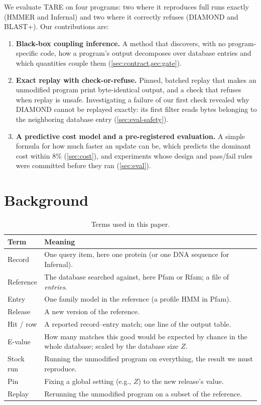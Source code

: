 \documentclass[letterpaper,twocolumn,10pt]{article}
\theoremstyle{definition}
\newcommand{\sys}{TARE\xspace}
\begin{document}
We evaluate \sys on four programs: two where it reproduces full runs exactly (HMMER and Infernal) and two where it
correctly refuses (DIAMOND and BLAST+). Our contributions are:
\begin{enumerate}
  \item \textbf{Black-box coupling inference.} A method that discovers, with no program-specific code, how a program's
  output decomposes over database entries and which quantities couple them (\cref{sec:contract,sec:gate}).
  \item \textbf{Exact replay with check-or-refuse.} Pinned, batched replay that makes an unmodified program print
  byte-identical output, and a check that refuses when replay is unsafe. Investigating a failure of our first check
  revealed why DIAMOND cannot be replayed exactly: its first filter reads bytes belonging to the neighboring
  database entry (\cref{sec:eval-safety}).
  \item \textbf{A predictive cost model and a pre-registered evaluation.} A simple formula for how much faster an update
  can be, which predicts the dominant cost within 8\% (\cref{sec:cost}), and experiments whose design and pass/fail
  rules were committed before they ran (\cref{sec:eval}).
\end{enumerate}

\section{Background}
\label{sec:background}

\begin{table}[t]
\caption{Terms used in this paper.}
\label{tab:glossary}
\centering\footnotesize
\setlength{\tabcolsep}{3pt}
\begin{tabular}{@{}>{\raggedright\arraybackslash}p{1.6cm}>{\raggedright\arraybackslash}p{6.2cm}@{}}
\toprule
Term & Meaning \\
\midrule
Record & One query item, here one protein (or one DNA sequence for Infernal). \\
Reference & The database searched against, here Pfam or Rfam; a file of \textit{entries}. \\
Entry & One family model in the reference (a profile HMM in Pfam). \\
Release & A new version of the reference. \\
Hit / row & A reported record--entry match; one line of the output table. \\
E-value & How many matches this good would be expected by chance in the whole database; scaled by the database size $Z$. \\
Stock run & Running the unmodified program on everything, the result we must reproduce. \\
Pin & Fixing a global setting (e.g., $Z$) to the new release's value. \\
Replay & Rerunning the unmodified program on a subset of the reference. \\
\bottomrule
\end{tabular}
\end{table}
\end{document}
